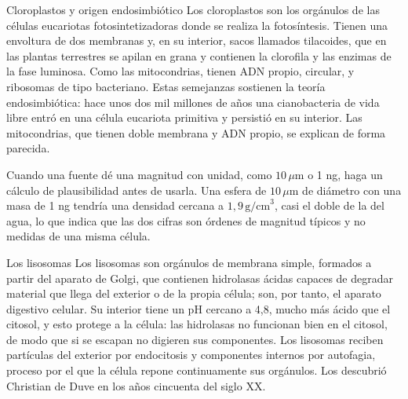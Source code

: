 \documentclass{book}
\begin{document}
\begin{tcolorbox}[title={Consejo}, studiumtip, breakable]

Cloroplastos y origen endosimbiótico
Los cloroplastos son los orgánulos de las células eucariotas fotosintetizadoras donde se realiza la fotosíntesis. Tienen una envoltura de dos membranas y, en su interior, sacos llamados tilacoides, que en las plantas terrestres se apilan en grana y contienen la clorofila y las enzimas de la fase luminosa. Como las mitocondrias, tienen ADN propio, circular, y ribosomas de tipo bacteriano. Estas semejanzas sostienen la teoría endosimbiótica: hace unos dos mil millones de años una cianobacteria de vida libre entró en una célula eucariota primitiva y persistió en su interior. Las mitocondrias, que tienen doble membrana y ADN propio, se explican de forma parecida.


Cuando una fuente dé una magnitud con unidad, como \(10\,\mu\mathrm{m}\) o 1 ng, haga un cálculo de plausibilidad antes de usarla. Una esfera de \(10\,\mu\mathrm{m}\) de diámetro con una masa de 1 ng tendría una densidad cercana a \(1{,}9\,\mathrm{g/cm}^{3}\), casi el doble de la del agua, lo que indica que las dos cifras son órdenes de magnitud típicos y no medidas de una misma célula.

\end{tcolorbox}

\begin{tcolorbox}[title={Definición}, studiumdef, breakable]

Los lisosomas
Los lisosomas son orgánulos de membrana simple, formados a partir del aparato de Golgi, que contienen hidrolasas ácidas capaces de degradar material que llega del exterior o de la propia célula; son, por tanto, el aparato digestivo celular. Su interior tiene un pH cercano a 4,8, mucho más ácido que el citosol, y esto protege a la célula: las hidrolasas no funcionan bien en el citosol, de modo que si se escapan no digieren sus componentes. Los lisosomas reciben partículas del exterior por endocitosis y componentes internos por autofagia, proceso por el que la célula repone continuamente sus orgánulos. Los descubrió Christian de Duve en los años cincuenta del siglo XX.

\end{tcolorbox}
\end{document}
